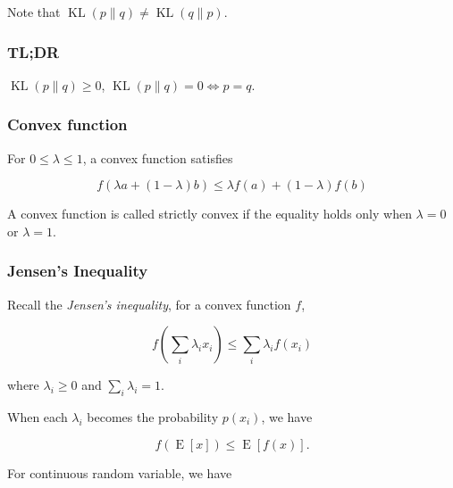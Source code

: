 \documentclass{article}
\begin{document}
            Note that $ \operatorname{KL}(p \| q) \neq \operatorname{KL}(q \| p) $.

            \subsubsection*{TL;DR}

                $ \operatorname{KL}(p \| q) \geq 0 $, $ \operatorname{KL}(p \| q) = 0 \iff p = q $.


            \subsubsection*{Convex function}
                
                For $ 0 \leq \lambda \leq 1 $, a convex function satisfies

                \begin{equation*}
                    f(\lambda a + (1 - \lambda) b) \leq \lambda f(a) + (1 - \lambda) f(b)
                \end{equation*}

                A convex function is called strictly convex if the equality
                holds only when $ \lambda = 0 $ or $ \lambda = 1 $.

            \subsubsection*{Jensen's Inequality}

                Recall the \textit{Jensen's inequality}, for a convex function $ f $,

                \begin{equation*}
                    f \left( \sum_{i} \lambda_{i} x_{i}  \right) \leq \sum_{i} \lambda_{i} f(x_{i})
                \end{equation*}

                where $ \lambda_{i} \geq 0 $ and $ \sum_{i} \lambda_{i} = 1 $.

                When each $ \lambda_{i} $ becomes the probability $ p(x_{i}) $, we have

                \begin{equation*}
                    f\left( \operatorname{E}[x] \right) \leq \operatorname{E}[f(x)].
                \end{equation*}

                For continuous random variable, we have
\end{document}

